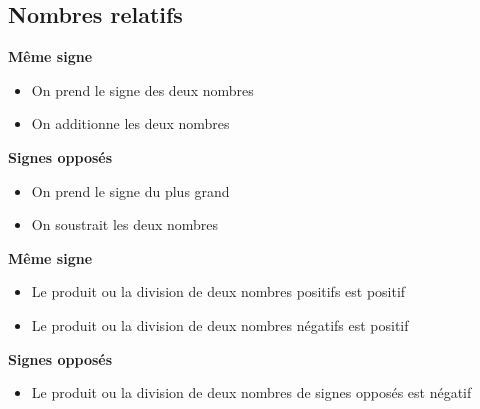 \subsection{Nombres relatifs}

{\begin{minipage}{0.45\textwidth}
    \textbf{Même signe}
    \begin{itemize}
    \item On prend le signe des deux nombres
    \item On additionne les deux nombres
    \end{itemize}
\end{minipage}
\hfill
\begin{minipage}{0.45\textwidth}
    \textbf{Signes opposés}
    \begin{itemize}
    \item On prend le signe du plus grand
    \item On soustrait les deux nombres
    \end{itemize}    
\end{minipage}  }


{\textbf{Même signe}
\begin{itemize}
    \item Le produit ou la division de deux nombres positifs est positif
    \item Le produit ou la division de deux nombres négatifs est positif
\end{itemize}
\vspace{1em}
\textbf{Signes opposés}
\begin{itemize}
    \item Le produit ou la division de deux nombres de signes opposés est négatif
\end{itemize}
}


